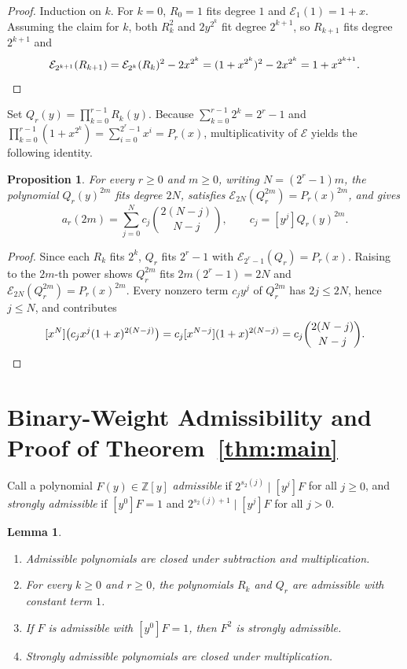 \documentclass[11pt]{article}
\newtheorem{proposition}[theorem]{Proposition}
\newtheorem{lemma}[theorem]{Lemma}
\theoremstyle{remark}
\begin{document}
\begin{proof}
Induction on $k$. For $k = 0$, $R_0 = 1$ fits degree $1$ and $\mathcal{E}_1(1) = 1 + x$. Assuming the claim for $k$, both $R_k^2$ and $2y^{2^k}$ fit degree $2^{k+1}$, so $R_{k+1}$ fits degree $2^{k+1}$ and
\[
  \mathcal{E}_{2^{k+1}}(R_{k+1}) = \mathcal{E}_{2^k}(R_k)^2 - 2x^{2^k} = (1 + x^{2^k})^2 - 2x^{2^k} = 1 + x^{2^{k+1}}. \qedhere
\]
\end{proof}

Set $Q_r(y) = \prod_{k=0}^{r-1} R_k(y)$. Because $\sum_{k=0}^{r-1} 2^k = 2^r - 1$ and $\prod_{k=0}^{r-1}(1 + x^{2^k}) = \sum_{i=0}^{2^r - 1} x^i = P_r(x)$, multiplicativity of $\mathcal{E}$ yields the following identity.

\begin{proposition}\label{prop:Qr}
For every $r \ge 0$ and $m \ge 0$, writing $N = (2^r - 1)m$, the polynomial $Q_r(y)^{2m}$ fits degree $2N$, satisfies $\mathcal{E}_{2N}(Q_r^{2m}) = P_r(x)^{2m}$, and gives
\begin{equation}\label{eq:central-expansion}
  a_r(2m) = \sum_{j = 0}^{N} c_j \binom{2(N-j)}{N-j}, \qquad c_j = [y^j] Q_r(y)^{2m}.
\end{equation}
\end{proposition}

\begin{proof}
Since each $R_k$ fits $2^k$, $Q_r$ fits $2^r - 1$ with $\mathcal{E}_{2^r - 1}(Q_r) = P_r(x)$. Raising to the $2m$-th power shows $Q_r^{2m}$ fits $2m(2^r - 1) = 2N$ and $\mathcal{E}_{2N}(Q_r^{2m}) = P_r(x)^{2m}$. Every nonzero term $c_j y^j$ of $Q_r^{2m}$ has $2j \le 2N$, hence $j \le N$, and contributes
\[
  [x^N]\bigl(c_j x^j (1 + x)^{2(N-j)}\bigr) = c_j [x^{N-j}](1 + x)^{2(N-j)} = c_j \binom{2(N-j)}{N-j}. \qedhere
\]
\end{proof}

\section{Binary-Weight Admissibility and Proof of Theorem~\ref{thm:main}}

Call a polynomial $F(y) \in \mathbb{Z}[y]$ \emph{admissible} if $2^{s_2(j)} \mid [y^j]F$ for all $j \ge 0$, and \emph{strongly admissible} if $[y^0]F = 1$ and $2^{s_2(j)+1} \mid [y^j]F$ for all $j > 0$.

\begin{lemma}\label{lem:adm}
\begin{enumerate}
  \item Admissible polynomials are closed under subtraction and multiplication.
  \item For every $k \ge 0$ and $r \ge 0$, the polynomials $R_k$ and $Q_r$ are admissible with constant term $1$.
  \item If $F$ is admissible with $[y^0]F = 1$, then $F^2$ is strongly admissible.
  \item Strongly admissible polynomials are closed under multiplication.
\end{enumerate}
\end{lemma}
\end{document}
